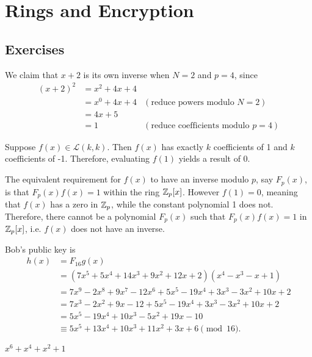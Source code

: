 \section{Rings and Encryption}
\subsection*{Exercises}
\begin{questions}
    \item We claim that $x+2$ is its own inverse when $N = 2$ and $p = 4$, since
    \begin{align*}
        (x+2)^2 &= x^2 + 4x + 4\\
        &= x^0 + 4x + 4 & (\text{reduce powers modulo } N = 2)\\
        &= 4x + 5\\
        &= 1 & (\text{reduce coefficients modulo } p = 4)
    \end{align*}

    \item Suppose $f(x) \in \mathcal{L}(k,k)$. Then $f(x)$ has exactly $k$ coefficients of 1 and $k$ coefficients of -1. Therefore, evaluating $f(1)$ yields a result of 0.

    The equivalent requirement for $f(x)$ to have an inverse modulo $p$, say $F_p(x)$, is that $F_p(x)f(x) = 1$ within the ring $\mathbb{Z}_p[x]$. However $f(1) = 0$, meaning that $f(x)$ has a zero in $\mathbb{Z}_p$, while the constant polynomial 1 does not. Therefore, there cannot be a polynomial $F_p(x)$ such that $F_p(x)f(x) = 1$ in $\mathbb{Z}_p[x]$, i.e. $f(x)$ does not have an inverse.

    \item Bob's public key is
    \begin{align*}
        h(x) &= F_{16}g(x)\\
        &= (7x^5 + 5x^4 + 14x^3 + 9x^2 + 12x + 2)(x^4 - x^3 - x + 1)\\
        &= 7x^9 - 2x^8 + 9x^7 - 12x^6 + 5x^5 - 19x^4 + 3x^3 - 3x^2 + 10x + 2\\
        &= 7x^3 - 2x^2 + 9x - 12 + 5x^5 - 19x^4 + 3x^3 - 3x^2 + 10x + 2\\
        &= 5x^5 - 19x^4 + 10x^3 - 5x^2 + 19x - 10\\
        &\equiv 5x^5 + 13x^4 + 10x^3 + 11x^2 + 3x + 6 \pmod{16}.
    \end{align*}

    \item $x^6 + x^4 + x^2 + 1$


\end{questions}
